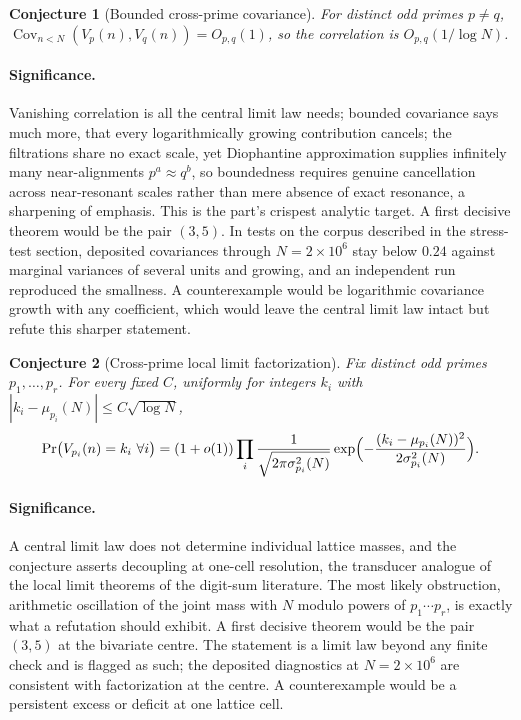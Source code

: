 \documentclass[11pt]{article}
\newtheorem{conjecture}{Conjecture}
\theoremstyle{definition}
\begin{document}
\begin{conjecture}[Bounded cross-prime covariance]\label{ab13}
For distinct odd primes $p\ne q$, $\operatorname{Cov}_{n<N}(V_p(n),V_q(n))=O_{p,q}(1)$, so the correlation is $O_{p,q}(1/\log N)$.
\end{conjecture}

\paragraph{Significance.}
Vanishing correlation is all the central limit law needs; bounded covariance says much more, that every logarithmically growing contribution cancels; the filtrations share no exact scale, yet Diophantine approximation supplies infinitely many near-alignments $p^a\approx q^b$, so boundedness requires genuine cancellation across near-resonant scales rather than mere absence of exact resonance, a sharpening of emphasis.  This is the part's crispest analytic target.  A first decisive theorem would be the pair $(3,5)$.  In tests on the corpus described in the stress-test section, deposited covariances through $N=2\times10^6$ stay below $0.24$ against marginal variances of several units and growing, and an independent run reproduced the smallness.  A counterexample would be logarithmic covariance growth with any coefficient, which would leave the central limit law intact but refute this sharper statement.

\begin{conjecture}[Cross-prime local limit factorization]\label{ab14}
Fix distinct odd primes $p_1,\ldots,p_r$.  For every fixed $C$, uniformly for integers $k_i$ with $|k_i-\mu_{p_i}(N)|\le C\sqrt{\log N}$,
\[
\Pr\bigl(V_{p_i}(n)=k_i\ \forall i\bigr)=(1+o(1))\prod_i\frac{1}{\sqrt{2\pi\sigma^2_{p_i}(N)}}\exp\Bigl(-\frac{(k_i-\mu_{p_i}(N))^2}{2\sigma^2_{p_i}(N)}\Bigr).
\]
\end{conjecture}

\paragraph{Significance.}
A central limit law does not determine individual lattice masses, and the conjecture asserts decoupling at one-cell resolution, the transducer analogue of the local limit theorems of the digit-sum literature.  The most likely obstruction, arithmetic oscillation of the joint mass with $N$ modulo powers of $p_1\cdots p_r$, is exactly what a refutation should exhibit.  A first decisive theorem would be the pair $(3,5)$ at the bivariate centre.  The statement is a limit law beyond any finite check and is flagged as such; the deposited diagnostics at $N=2\times10^6$ are consistent with factorization at the centre.  A counterexample would be a persistent excess or deficit at one lattice cell.
\end{document}
